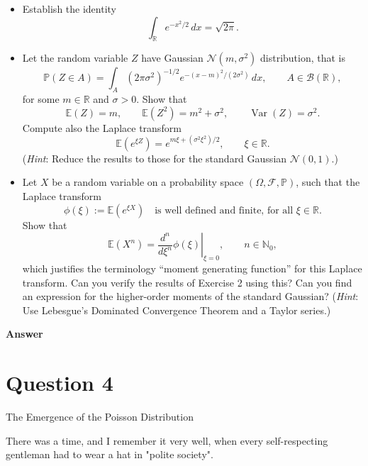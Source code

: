 \documentclass[letterpaper]{article}
\begin{document}
		\begin{itemize}
			
			\item[(i)] Establish the identity
			\[
			\int_{\mathbb{R}} e^{-x^{2}/2}\,dx = \sqrt{2\pi}.
			\]
			
			\item[(ii)] Let the random variable $Z$ have Gaussian $\mathcal{N}(m,\sigma^{2})$ distribution, that is
			\[
			\mathbb{P}(Z \in A)
			=
			\int_{A} (2\pi\sigma^{2})^{-1/2}
			e^{-(x-m)^{2}/(2\sigma^{2})}\,dx,
			\qquad
			A \in \mathcal{B}(\mathbb{R}),
			\]
			for some $m \in \mathbb{R}$ and $\sigma > 0$. Show that
			\[
			\mathbb{E}(Z) = m,
			\qquad
			\mathbb{E}(Z^{2}) = m^{2} + \sigma^{2},
			\qquad
			\operatorname{Var}(Z) = \sigma^{2}.
			\]
			Compute also the Laplace transform
			\[
			\mathbb{E}\!\left(e^{\xi Z}\right)
			=
			e^{m\xi + (\sigma^{2}\xi^{2})/2},
			\qquad
			\xi \in \mathbb{R}.
			\]
			(\emph{Hint}: Reduce the results to those for the standard Gaussian $\mathcal{N}(0,1)$.)
			
			\item[(iii)] Let $X$ be a random variable on a probability space $(\Omega,\mathcal{F},\mathbb{P})$, such that the Laplace transform
			\[
			\phi(\xi) := \mathbb{E}\!\left(e^{\xi X}\right)
			\quad \text{is well defined and finite, for all } \xi \in \mathbb{R}.
			\]
			Show that
			\[
			\mathbb{E}\!\left(X^{n}\right)
			=
			\left.
			\frac{d^{n}}{d\xi^{n}} \phi(\xi)
			\right|_{\xi=0},
			\qquad
			n \in \mathbb{N}_{0},
			\]
			which justifies the terminology ``moment generating function'' for this Laplace transform. Can you verify the results of Exercise 2 using this? Can you find an expression for the higher-order moments of the standard Gaussian? (\emph{Hint}: Use Lebesgue's Dominated Convergence Theorem and a Taylor series.)
			
			
			
		\end{itemize}
		
		\textbf{Answer}
		
		\clearpage
		
		\section{Question 4}
		
		{\color{deepred} The Emergence of the Poisson Distribution}
		
		There was a time, and I remember it very well, when every self-respecting gentleman had to wear a hat in "polite society".
		
\end{document}
